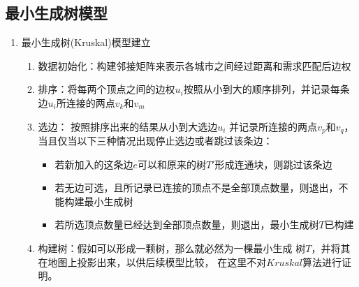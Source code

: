 \documentclass[UTF8,12pt]{ctexart}
\begin{document}
\subsection{最小生成树模型}\label{ZXSCSMX}
\begin{enumerate}
    \item 最小生成树(Kruskal)模型建立
          \begin{enumerate}
              \item 数据初始化：构建邻接矩阵来表示各城市之间经过距离和需求匹配后边权
              \item 排序：将每两个顶点之间的边权$u_i$按照从小到大的顺序排列，并记录每条边$u_i$所连接的两点$v_k$和$v_m$
              \item 选边：
                    按照排序出来的结果从小到大选边$u_i$
                    并记录所连接的两点$v_p$和$v_q$，
                    当且仅当以下三种情况出现停止选边或者跳过该条边：
                    \begin{itemize}
                        \item 若新加入的这条边$e$可以和原来的树$T'$形成连通块，则跳过该条边
                        \item 若无边可选，且所记录已连接的顶点不是全部顶点数量，则退出，不能构建最小生成树
                        \item 若所选顶点数量已经达到全部顶点数量，则退出，最小生成树$T$已构建
                    \end{itemize}
              \item 构建树：假如可以形成一颗树，那么就必然为一棵最小生成
                    树$T$，并将其在地图上投影出来，以供后续模型比较，
                    在这里不对$Kruskal$算法进行证明。
          \end{enumerate}


\end{enumerate}
\end{document}
